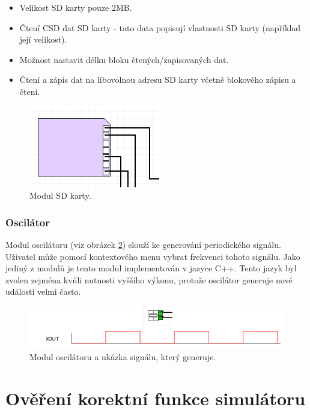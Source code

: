 \begin{itemize}
\item Velikost SD karty pouze 2MB.
\item Čtení CSD dat SD karty - tato data popisují vlastnosti SD karty (například její velikost).
\item Možnost nastavit délku bloku čtených/zapisovaných dat.
\item Čtení a zápis dat na libovolnou adresu SD karty včetně blokového zápisu a čtení.
\end{itemize}

\begin{figure}[ht]
\centering
\includegraphics[trim=0cm 0cm 0cm 0cm, scale=1]{fig/sd}
\caption{Modul SD karty.}
\label{fig:sd}
\end{figure}

\subsection{Oscilátor}

Modul oscilátoru (viz obrázek \ref{fig:oscilator}) slouží ke generování periodického signálu. Uživatel může pomocí kontextového menu vybrat frekvenci tohoto signálu. Jako jediný z modulů je tento modul implementován v jazyce C++. Tento jazyk byl zvolen zejména kvůli nutnosti vyššího výkonu, protože oscilátor generuje nové události velmi často.

\begin{figure}[ht]
\centering
\includegraphics[trim=0cm 0cm 0cm 0cm, scale=0.8]{fig/oscilator}
\caption{Modul oscilátoru a ukázka signálu, který generuje.}
\label{fig:oscilator}
\end{figure}

\chapter{Ověření korektní funkce simulátoru}

